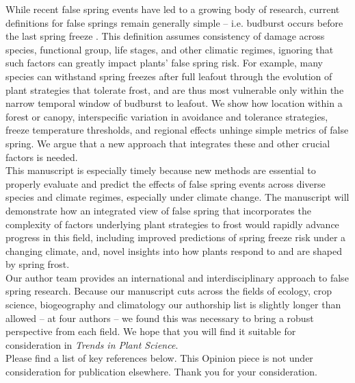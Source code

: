 \documentclass[11pt,a4paper]{article}\usepackage[]{graphicx}\usepackage[]{color}
\begin{document}
\noindent While recent false spring events have led to a growing body of research, current definitions for false springs remain generally simple -- i.e. budburst occurs before the last spring freeze \citep{Gu2008}. This definition assumes consistency of damage across species, functional group, life stages, and other climatic regimes, ignoring that such factors can greatly impact plants' false spring risk. For example, many species can withstand spring freezes after full leafout through the evolution of plant strategies that tolerate frost, and are thus most vulnerable only within the narrow temporal window of budburst to leafout. We show how location within a forest or canopy, interspecific variation in avoidance and tolerance strategies, freeze temperature thresholds, and regional effects unhinge simple metrics of false spring. We argue that a new approach that integrates these and other crucial factors is needed.  \\

\noindent This manuscript is especially timely because new methods are essential to properly evaluate and predict the effects of false spring events across diverse species and climate regimes, especially under climate change. The manuscript will demonstrate how an integrated view of false spring that incorporates the complexity of factors underlying plant strategies to frost would rapidly advance progress in this field, including improved predictions of spring freeze risk under a changing climate, and, novel insights into how plants respond to and are shaped by spring frost. \\

\noindent Our author team provides an international and interdisciplinary approach to false spring research. Because our manuscript cuts across the fields of ecology, crop science, biogeography and climatology our authorship list is slightly longer than allowed -- at four authors -- we found this was necessary to bring a robust perspective from each field. We hope that you will find it suitable for consideration in \textit{Trends in Plant Science}. \\

\noindent Please find a list of key references below. This Opinion piece is not under consideration for publication elsewhere. Thank you for your consideration. \\
\end{document}
